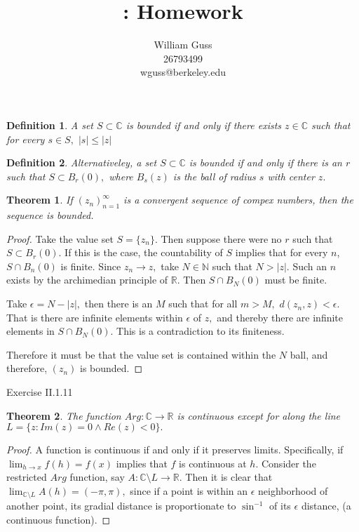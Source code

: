 \documentclass[letter]{article}
\title{\bCLASS: Homework \bHWN}
\author{William Guss\\26793499\\wguss@berkeley.edu}
\newtheorem{theorem}{Theorem}
\newtheorem{definition}{Definition}
\newenvironment{menumerate}{%
  \edef\backupindent{\the\parindent}%
  \enumerate%
  \setlength{\parindent}{\backupindent}%
}{\endenumerate}
\begin{document}
\maketitle
\thispagestyle{empty}


\begin{menumerate}
	\item
	\begin{definition}
		A set $S \subset \mathbb{C}$ is bounded if and only if there exists $ z \in \mathbb{C}$ such that for every $s \in S,$ $|s| \leq |z|$
	\end{definition}
	\begin{definition}
		Alternativeley, a set $S \subset \mathbb{C}$ is bounded if and only if there is an $r$  such that $S \subset B_r(0),$ where $B_s(z)$ is the ball of radius $s$ with center $z.$
	\end{definition}
	\begin{theorem}
		If $(z_n)^\infty_{n=1}$ is a convergent sequence of compex numbers,
		then the sequence is bounded.
	\end{theorem}
	\begin{proof}
		Take the value set $S = \{z_n\}.$ Then suppose there were no $r$ such that $S \subset B_r(0)$. If this is the case, the countability of $S$ implies that for every $n$, $S \cap B_n(0)$ is finite.
		Since $z_n \to z,$ take $N \in \mathbb{N}$ such that $N > |z|.$ Such an $n$ exists by the archimedian principle of $\mathbb{R}.$ Then $S \cap B_N(0)$ must be finite. 

		Take $\epsilon = N - |z|,$ then there is an $M$ such that for all $m > M,$ $d(z_n,z) < \epsilon.$ That is there are infinite elements within $\epsilon$ of $z,$ and thereby there are infinite elements in $S \cap B_N(0).$ This is a contradiction to its finiteness.

		Therefore it must be that the value set is contained within the $N$ ball, and therefore,  $(z_n)$ is bounded. 
	\end{proof} 

	\item Exercise II.1.11
	\begin{theorem}
	The function $Arg : \mathbb{C} \to \mathbb{R}$ is continuous except for along the line $L = \{z : Im(z) = 0 \wedge Re(z) < 0\}.$
	\end{theorem}
	\begin{proof}
		A function is continuous if and only if it preserves limits. Specifically, if $\lim_{h \to x} f(h) = f(x) $ implies that $f$ is continuous at $h$. Consider the restricted $Arg$ function, say $A:\mathbb{C} \setminus L \to \mathbb{R}.$ Then it is clear that $\lim_{\mathbb{C}\setminus L} A(h) = (-\pi,\pi),$ since if a point is
		within an $\epsilon$ neighborhood of another point, its gradial distance is proportionate to $\sin^{-1}$ of its $\epsilon$ distance, (a continuous function).


\end{proof}
\end{menumerate}
\end{document}
